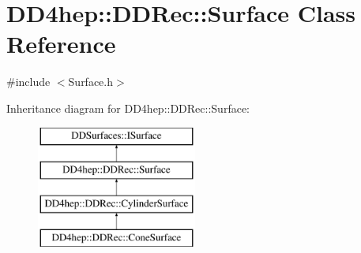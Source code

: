 \hypertarget{class_d_d4hep_1_1_d_d_rec_1_1_surface}{}\section{D\+D4hep\+:\+:D\+D\+Rec\+:\+:Surface Class Reference}
\label{class_d_d4hep_1_1_d_d_rec_1_1_surface}


{\ttfamily \#include $<$Surface.\+h$>$}

Inheritance diagram for D\+D4hep\+:\+:D\+D\+Rec\+:\+:Surface\+:\begin{figure}[H]
\begin{center}
\leavevmode
\includegraphics[height=4.000000cm]{class_d_d4hep_1_1_d_d_rec_1_1_surface}
\end{center}
\end{figure}
